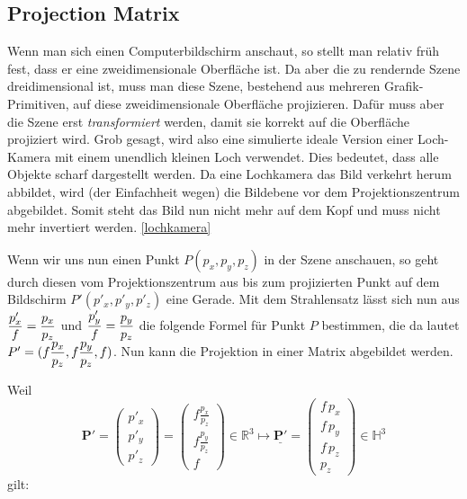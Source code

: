 \subsection{Projection Matrix}
Wenn man sich einen Computerbildschirm anschaut, so stellt man relativ früh fest, dass er eine zweidimensionale Oberfläche ist. 
Da aber die zu rendernde Szene dreidimensional ist, muss man diese Szene, bestehend aus mehreren Grafik-Primitiven, auf diese zweidimensionale Oberfläche projizieren. Dafür muss aber die Szene erst \textit{transformiert} werden, damit sie korrekt auf die Oberfläche projiziert wird. 
Grob gesagt, wird also eine simulierte ideale Version einer Loch-Kamera mit einem unendlich kleinen Loch verwendet. Dies bedeutet, dass alle Objekte scharf dargestellt werden. Da eine Lochkamera das Bild verkehrt herum abbildet, wird (der Einfachheit wegen) die Bildebene vor dem Projektionszentrum abgebildet. Somit steht das Bild nun nicht mehr auf dem Kopf und muss nicht mehr invertiert werden. \cref{lochkamera}

Wenn wir uns nun einen Punkt $P(p_{x}, p_{y}, p_{z})$ in der Szene anschauen, so geht durch diesen vom Projektionszentrum aus bis zum projizierten Punkt auf dem Bildschirm $P'(p'_{x}, p'_{y}, p'_{z})$ eine Gerade. Mit dem Strahlensatz lässt sich nun aus $\dfrac{p'_{x}}{\mathnormal{f}} = \dfrac{p_{x}}{p_{z}} $ und $ \dfrac{p'_{y}}{\mathnormal{f}} = \dfrac{p_{y}}{p_{z}} $ die folgende Formel für Punkt $P$ bestimmen, die da lautet $P'=(\mathnormal{f}\dfrac{p_{x}}{p_{z}}, \mathnormal{f}\dfrac{p_{y}}{p_{z}}, \mathnormal{f})$.
Nun kann die Projektion in einer Matrix abgebildet werden.

Weil $$\mathbf{P'}= \begin{pmatrix} p'_x \\ p'_y \\ p'_z \end{pmatrix}= \begin{pmatrix} f
\frac{p_x}{p_z}\\ f \frac{p_y}{p_z}\\ f \end{pmatrix} \in \mathbb{R}^3 \longmapsto \underline{\mathbf{P'}}= \begin{pmatrix}f \, p_x \\f \, p_y \\ f \, p_z\\
p_z\end{pmatrix} \in \mathbb{H}^3 $$
gilt:	


